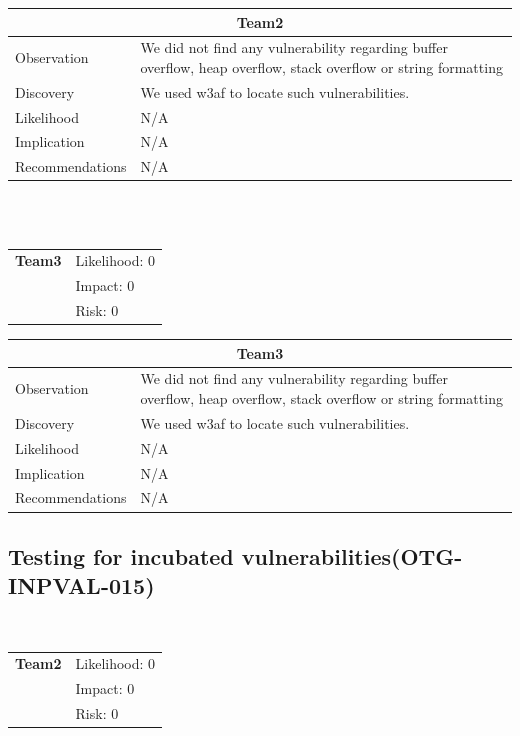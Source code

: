 \documentclass[headsepline,footsepline,footinclude=false,oneside,fontsize=11pt,paper=a4,listof=totoc,bibliography=totoc]{scrbook} %
\begin{document}
\begin{tabular}{ l|p{11cm}  }
	\hline
	\multicolumn{2}{c}{\textbf{Team2}} \\
	\hline
	Observation   & We did not find any vulnerability regarding buffer overflow,
	heap overflow, stack overflow or string formatting\\
	Discovery  & We used w3af to locate such vulnerabilities. \\
	Likelihood & N/A \\
	Implication    & N/A \\
	Recommendations & N/A \\ 
	\hline
\end{tabular}
\\
\vspace{0.5cm}
\\
\begin{tabular}{cR{12cm}}
	\textbf{Team3} & Likelihood: 0\\& Impact: 0\\& Risk: 0
\end{tabular}

\begin{tabular}{ l|p{11cm}  }
	\hline
	\multicolumn{2}{c}{\textbf{Team3}} \\
	\hline
	Observation   & We did not find any vulnerability regarding buffer overflow,
	heap overflow, stack overflow or string formatting\\
	Discovery  & We used w3af to locate such vulnerabilities. \\
	Likelihood & N/A \\
	Implication    & N/A \\
	Recommendations & N/A \\ 
	\hline
\end{tabular}
\pagebreak
\subsection{Testing for incubated vulnerabilities(OTG-INPVAL-015)}\

\begin{tabular}{cR{12cm}}
	\textbf{Team2} & Likelihood: 0\\& Impact: 0\\& Risk: 0
\end{tabular}
\end{document}
